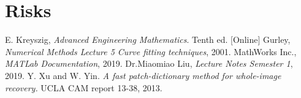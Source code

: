 \documentclass[a4paper]{article}
\begin{document}
\section{Risks}

\begin{thebibliography}{9}
  E. Kreyszig,
  \emph{Advanced Engineering Mathematics}.
   Tenth ed. [Online]
  Gurley,
  \emph{Numerical Methods Lecture 5 Curve fitting techniques},
   2001.
  MathWorks Inc.,
  \emph{MATLab Documentation},
   2019.
  Dr.Miaomiao Liu,
  \emph{Lecture Notes Semester 1},
   2019.
Y. Xu and W. Yin. \emph{A fast patch-dictionary method for whole-image recovery.} UCLA CAM report 13-38, 2013.
\end{thebibliography}
\end{document}
